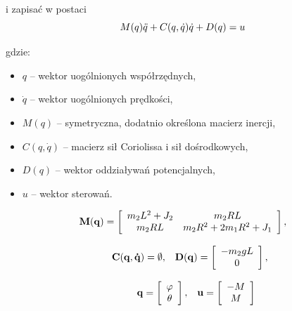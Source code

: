 i zapisać w postaci 
$$
M(q)\Ddot{q} + C(q,\dot{q})\dot{q} + D(q) = u 
$$

gdzie:
\begin{itemize}
    \item $q$ -- wektor uogólnionych współrzędnych,
    \item $\dot{q}$ -- wektor uogólnionych prędkości,
    \item $M(q)$ -- symetryczna, dodatnio określona macierz inercji,
    \item $C(q,\dot{q})$ -- macierz sił Coriolissa i sił dośrodkowych,
    \item $D(q)$ -- wektor oddziaływań potencjalnych,
    \item $u$ -- wektor sterowań.
\end{itemize}

$$
\begin{array}{cc}
    \mathbf{M(q)} =
        \left[ \begin{array}{cc}
            m_2L^2 + J_2 & m_2RL \\
            m_2RL & m_2R^2 + 2m_1R^2 + J_1
        \end{array} \right], \\ \\
    \newline
    \begin{array}{cc}
        \mathbf{C(q,\dot{q})} = \emptyset,
        &
        \mathbf{D(q)} =
        \left[ \begin{array}{c}
        -m_2gL \\
        0
        \end{array} \right],
    \end{array} \\ \\
    \newline
    \begin{array}{cc}
        \mathbf{q} =
        \left[ \begin{array}{c}
        \varphi \\
        \theta \\
        \end{array} \right],
        &
        \mathbf{u} =
        \left[ \begin{array}{c}
        -M \\
        M \\
        \end{array} \right]
    \end{array} \\ \\
    \newline
\end{array}
$$

